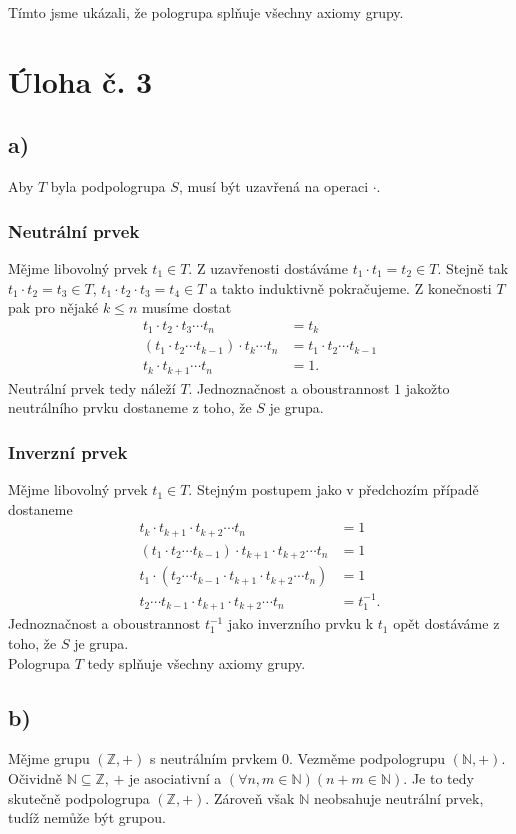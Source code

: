 \documentclass{scrartcl}
\begin{document}
    Tímto jsme ukázali, že pologrupa splňuje všechny axiomy grupy.


    \section*{Úloha č. 3}
    \subsection*{a)}
    Aby $T$ byla podpologrupa $S$, musí být uzavřená na operaci $\cdot$.
    \subsubsection*{Neutrální prvek}
    Mějme libovolný prvek $t_1 \in T$. Z uzavřenosti dostáváme $t_1 \cdot t_1 = t_2 \in T$. Stejně tak $t_1 \cdot t_2 = t_3 \in T$, $t_1 \cdot t_2 \cdot t_3 = t_4 \in T$ a takto induktivně pokračujeme. Z konečnosti $T$ pak pro nějaké $k \leq n$ musíme dostat
    \begin{align*}
        t_1 \cdot t_2 \cdot t_3 \cdots t_n &= t_k \\
        (t_1 \cdot t_2 \cdots t_{k-1}) \cdot t_k \cdots t_n &= t_1 \cdot t_2 \cdots t_{k-1} \\
        t_k \cdot t_{k+1} \cdots t_n &= 1.
    \end{align*}
    Neutrální prvek tedy náleží $T$. Jednoznačnost a oboustrannost $1$ jakožto neutrálního prvku dostaneme z toho, že $S$ je grupa.
    \subsubsection*{Inverzní prvek}
    Mějme libovolný prvek $t_1 \in T$. Stejným postupem jako v předchozím případě dostaneme
    \begin{align*}
        t_k \cdot t_{k+1} \cdot t_{k+2} \cdots t_n &= 1 \\
        (t_1 \cdot t_2 \cdots t_{k-1}) \cdot t_{k+1} \cdot t_{k+2} \cdots t_n &= 1 \\
        t_1 \cdot (t_2 \cdots t_{k-1} \cdot t_{k+1} \cdot t_{k+2} \cdots t_n) &= 1 \\
        t_2 \cdots t_{k-1} \cdot t_{k+1} \cdot t_{k+2} \cdots t_n &= t_1^{-1}.
    \end{align*}
    Jednoznačnost a oboustrannost $t_1^{-1}$ jako inverzního prvku k $t_1$ opět dostáváme z toho, že $S$ je grupa. \\
    
    Pologrupa $T$ tedy splňuje všechny axiomy grupy.

    \subsection*{b)}
    Mějme grupu $(\mathbb{Z},+)$ s neutrálním prvkem 0. Vezměme podpologrupu $(\mathbb{N}, +)$. Očividně $\mathbb{N} \subseteq \mathbb{Z}$, $+$ je asociativní a $(\forall n,m \in \mathbb{N})(n+m \in \mathbb{N})$. Je to tedy skutečně podpologrupa $(\mathbb{Z},+)$. Zároveň však $\mathbb{N}$ neobsahuje neutrální prvek, tudíž nemůže být grupou.
\end{document}
